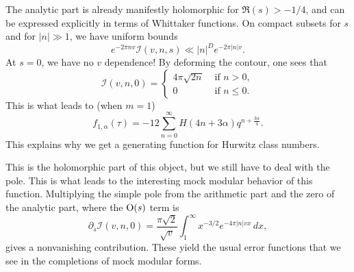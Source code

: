 \documentclass[reqno]{amsart} 
\numberwithin{theorem}{section}
\numberwithin{equation}{section}
\begin{document}
The analytic part is already manifestly holomorphic for $\Re(s) > -1/4$, and can be expressed explicitly in terms of Whittaker functions.  On compact subsets for $s$ and for $\lvert n \rvert \gg 1$, we have uniform bounds
\begin{equation*}
  e^{- 2 \pi n v} \mathcal{I}(v, n, s) \ll \lvert n \rvert^D e^{- 2 \pi \lvert n \rvert v}.
\end{equation*}
At $s = 0$, we have no $v$ dependence!  By deforming the contour, one sees that
\begin{equation*}
  \mathcal{I}(v, n, 0) =
  \begin{cases}
    4 \pi \sqrt{2 n} &  \text{ if } n > 0, \\
    0 & \text{ if } n \leq 0.
  \end{cases}
\end{equation*}
This is what leads to (when $m = 1$)
\begin{equation*}
  f_{1, \alpha}(\tau) = - 12 \sum_{n = 0}^\infty H(4 n + 3 \alpha) q^{n + \frac{3 \alpha}{4}}.
\end{equation*}
This explains why we get a generating function for Hurwitz class numbers.

This is the holomorphic part of this object, but we still have to deal with the pole.  This is what leads to the interesting mock modular behavior of this function.  Multiplying the simple pole from the arithmetic part and the zero of the analytic part, where the $\operatorname{O}(s)$ term is
\begin{equation*}
  \partial_s \mathcal{I}(v, n, 0) = \frac{\pi \sqrt{2}}{ \sqrt{v}} \int_1^\infty x^{- 3/2} e^{- 4 \pi \lvert n \rvert v x} \, d x,
\end{equation*}
gives a nonvanishing contribution.  These yield the usual error functions that we see in the completions of mock modular forms.
\end{document}
